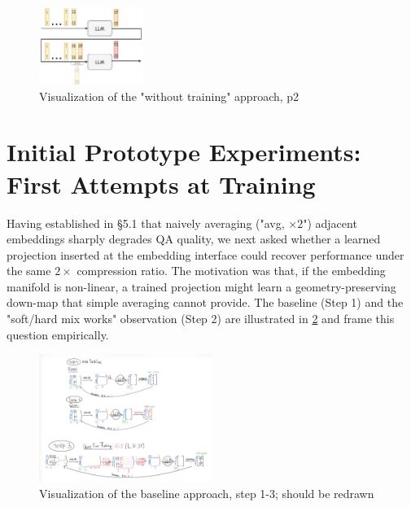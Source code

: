 \begin{figure}[hbt]
  \centering
  \includegraphics[width=0.3\textwidth]{graphs/ser2.jpeg}
  \caption{Visualization of the "without training" approach, p2}
  \label{fig:ser2}
\end{figure}


\section{Initial Prototype Experiments: First Attempts at Training}

Having established in \S5.1 that naively averaging ("avg, ×2") adjacent embeddings sharply degrades QA quality, we next asked whether a learned projection inserted at the embedding interface could recover performance under the same $2\times$ compression ratio.
The motivation was that, if the embedding manifold is non-linear, a trained projection might learn a geometry-preserving down-map that simple averaging cannot provide.
The baseline (Step 1) and the "soft/hard mix works" observation (Step 2) are illustrated in \ref{fig:steps1-3} and frame this question empirically.

\begin{figure}[hbt]
  \centering
  \includegraphics[width=0.5\textwidth]{graphs/steps1-3.jpg}
  \caption{Visualization of the baseline approach, step 1-3; should be redrawn}
  \label{fig:steps1-3}
\end{figure}  

